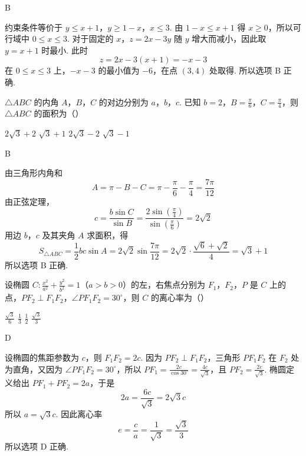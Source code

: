 \begin{answer}
B
\end{answer}

\begin{solution}
约束条件等价于 \(y\leqslant x+1\)，\(y\geqslant1-x\)，\(x\leqslant3\).
由 \(1-x\leqslant x+1\) 得 \(x\geqslant0\)，所以可行域中 \(0\leqslant x\leqslant3\). 对于固定的 \(x\)，\(z=2x-3y\) 随 \(y\) 增大而减小，因此取 \(y=x+1\) 时最小. 此时
\[
z=2x-3(x+1)=-x-3
\]
在 \(0\leqslant x\leqslant3\) 上，\(-x-3\) 的最小值为 \(-6\)，在点 \((3,4)\) 处取得. 所以选项 B 正确.
\end{solution}

\begin{problem}
\(\triangle ABC\) 的内角 \(A\)，\(B\)，\(C\) 的对边分别为 \(a\)，\(b\)，\(c\). 已知 \(b = 2\)，\(B = \frac{\pi}{6}\)，\(C = \frac{\pi}{4}\)，则 \(\triangle ABC\) 的面积为（\quad）

\choices
    {\(2\sqrt{3} + 2\)}
    {\(\sqrt{3} + 1\)}
    {\(2\sqrt{3} - 2\)}
    {\(\sqrt{3} - 1\)}
\end{problem}

\begin{answer}
B
\end{answer}

\begin{solution}
由三角形内角和
\[
A=\pi-B-C=\pi-\frac{\pi}{6}-\frac{\pi}{4}=\frac{7\pi}{12}
\]
由正弦定理，
\[
c=\frac{b\sin C}{\sin B}=\frac{2\sin(\frac{\pi}{4})}{\sin(\frac{\pi}{6})}=2\sqrt{2}
\]
用边 \(b\)，\(c\) 及其夹角 \(A\) 求面积，得
\[
S_{\triangle ABC}=\frac12bc\sin A
=2\sqrt{2}\sin\frac{7\pi}{12}
=2\sqrt{2}\cdot\frac{\sqrt{6}+\sqrt{2}}{4}
=\sqrt{3}+1
\]
所以选项 B 正确.
\end{solution}

\begin{problem}
设椭圆 \(C: \frac{x^2}{a^2} + \frac{y^2}{b^2} = 1\)（\(a > b > 0\)）的左，右焦点分别为 \(F_1\)，\(F_2\)，\(P\) 是 \(C\) 上的点，\(PF_2 \perp F_1F_2\)，\(\angle PF_1F_2 = 30^\circ\)，则 \(C\) 的离心率为（\quad）

\choices
    {\(\frac{\sqrt{3}}{6}\)}
    {\(\frac{1}{3}\)}
    {\(\frac{1}{2}\)}
    {\(\frac{\sqrt{3}}{3}\)}
\end{problem}

\begin{answer}
D
\end{answer}

\begin{solution}
设椭圆的焦距参数为 \(c\)，则 \(F_1F_2=2c\). 因为 \(PF_2\perp F_1F_2\)，三角形 \(PF_1F_2\) 在 \(F_2\) 处为直角，又因为 \(\angle PF_1F_2=30^\circ\)，所以 \(PF_1=\frac{2c}{\cos30^\circ}=\frac{4c}{\sqrt{3}}\)，且 \(PF_2=\frac{2c}{\sqrt{3}}\).
椭圆定义给出 \(PF_1+PF_2=2a\)，于是
\[
2a=\frac{6c}{\sqrt{3}}=2\sqrt{3}c
\]
所以 \(a=\sqrt{3}c\).
因此离心率
\[
e=\frac{c}{a}=\frac{1}{\sqrt{3}}=\frac{\sqrt{3}}{3}
\]
所以选项 D 正确.
\end{solution}

